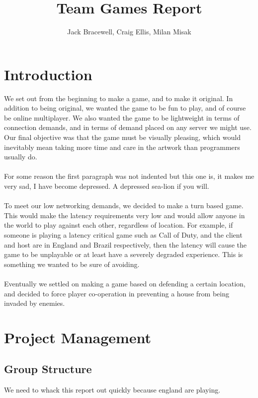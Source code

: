 \documentclass{article}
\begin{document}
\title{Team Games Report}
\author{Jack Bracewell, Craig Ellis, Milan Misak}
\date{}

\maketitle
\vspace{1.5cm}
\tableofcontents
\clearpage

\section{Introduction}
We set out from the beginning to make a game, and to make it original. In addition to being original, we wanted the game to be fun to play, and of course be online multiplayer. We also wanted the game to be lightweight in terms of connection demands, and in terms of demand placed on any server we might use. Our final objective was that the game must be visually pleasing, which would inevitably mean taking more time and care in the artwork than programmers usually do. \\ \\

For some reason the first paragraph was not indented but this one is, it makes me very sad, I have become depressed. A depressed sea-lion if you will. \\ \\

To meet our low networking demands, we decided to make a turn based game. This would make the latency requirements very low and would allow anyone in the world to play against each other, regardless of location. For example, if someone is playing a latency critical game such as Call of Duty, and the client and host are in England and Brazil respectively, then the latency will cause the game to be unplayable or at least have a severely degraded experience. This is something we wanted to be sure of avoiding. \\ \\

Eventually we settled on making a game based on defending a certain location, and decided to force player co-operation in preventing a house from being invaded by enemies. 




\section{Project Management}
\subsection{Group Structure}
We need to whack this report out quickly because england are playing.
\end{document}
